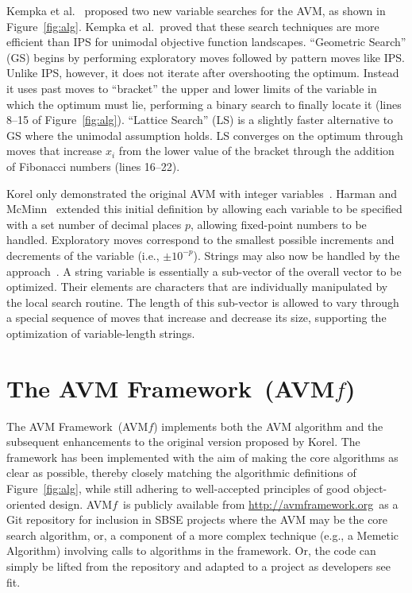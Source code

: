 \documentclass{llncs}
\newcommand{\longname}{AVM Framework\xspace}
\newcommand{\name}{\mbox{AVM\hspace{-1pt}$f$}\xspace}
\newcommand{\repourl}{\url{http://avmframework.org}\xspace}
\newcommand{\inlineheading}[1]{\vspace{1mm} \noindent {\bf #1.}}
\begin{document}
\inlineheading{New Variable Search Algorithms}
Kempka et al.~\cite{Kempka2013,Kempka2015} proposed two new variable searches for the AVM, as shown in Figure~\ref{fig:alg}. Kempka et al.\ proved that these search techniques are more efficient than IPS for unimodal objective function landscapes. ``Geometric Search'' (GS) begins by performing exploratory moves followed by pattern moves like IPS. Unlike IPS, however, it does not iterate after overshooting the optimum. Instead it uses past moves to  ``bracket'' the upper and lower limits of the variable in which the optimum must lie, performing a binary search to finally locate it (lines 8--15 of Figure~\ref{fig:alg}). ``Lattice Search'' (LS) is a slightly faster alternative to GS where the unimodal assumption holds. LS converges on the optimum through moves that increase $x_i$ from the lower value of the bracket through the addition of Fibonacci numbers (lines 16--22).

\inlineheading{New Representations} Korel only demonstrated the original AVM with integer variables~\cite{Korel1990}.  Harman and McMinn~\cite{Harman2007} extended this initial definition by allowing each variable to be specified with a set number of decimal places $p$, allowing fixed-point numbers to be handled. Exploratory moves correspond to the smallest possible increments and decrements of the variable (i.e., $\pm10^{-p}$). Strings may also now be handled by the approach~\cite{Kapfhammer2013,McMinn2015}. A string variable is essentially a sub-vector of the overall vector to be optimized. Their elements are characters that are individually manipulated by the local search routine. The length of this sub-vector is allowed to vary through a special sequence of moves that increase and decrease its size, supporting the optimization of variable-length strings.

\vspace{-1em}
\section{The \longname~(\name)}
\vspace{-1em}
\label{sec:avmf}

The \longname~(\name) implements both the AVM algorithm and the subsequent enhancements to the original version proposed by Korel. The framework has been implemented with the aim of making the core algorithms as clear as possible, thereby closely matching the algorithmic definitions of Figure~\ref{fig:alg}, while still adhering to well-accepted principles of good object-oriented design. \name~is publicly available from \repourl~as a Git repository for inclusion in SBSE projects where the AVM may be the core search algorithm, or, a component of a more complex technique (e.g., a Memetic Algorithm) involving calls to algorithms in the framework. Or, the code can simply be lifted from the repository and adapted to a project as developers see fit.
\end{document}
